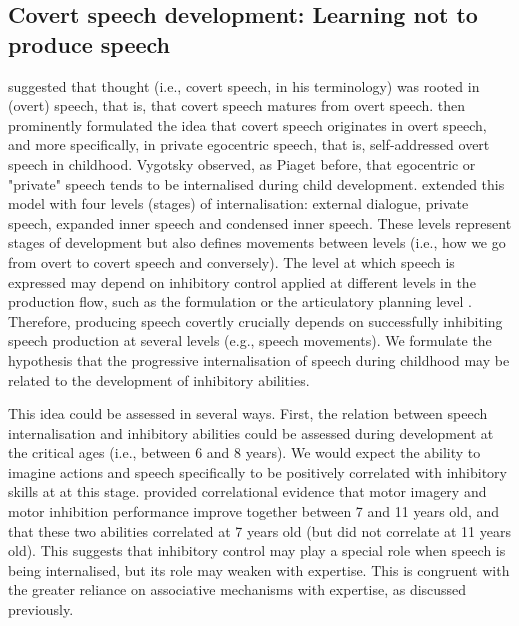 \documentclass[utf8]{template/frontiersSCNS} %
\begin{document}
\subsection{Covert speech development: Learning not to produce speech}

\cite{watson_psychology_1919} suggested that thought (i.e., covert speech, in his terminology) was rooted in (overt) speech, that is, that covert speech matures from overt speech. \cite{vygotsky_thought_1934} then prominently formulated the idea that covert speech originates in overt speech, and more specifically, in private egocentric speech, that is, self-addressed overt speech in childhood. Vygotsky observed, as Piaget before, that egocentric or "private" speech tends to be internalised during child development. \cite{fernyhough_alien_2004} extended this model with four levels (stages) of internalisation: external dialogue, private speech, expanded inner speech and condensed inner speech. These levels represent stages of development but also defines movements between levels (i.e., how we go from overt to covert speech and conversely). The level at which speech is expressed may depend on inhibitory control applied at different levels in the production flow, such as the formulation or the articulatory planning level \citep{grandchamp_condialint_2019}. Therefore, producing speech covertly crucially depends on successfully inhibiting speech production at several levels (e.g., speech movements). We formulate the hypothesis that the progressive internalisation of speech during childhood may be related to the development of inhibitory abilities.

This idea could be assessed in several ways. First, the relation between speech internalisation and inhibitory abilities could be assessed during development at the critical ages (i.e., between 6 and 8 years). We would expect the ability to imagine actions and speech specifically to be positively correlated with inhibitory skills at at this stage. \cite{wang_relationship_2021} provided correlational evidence that motor imagery and motor inhibition performance improve together between 7 and 11 years old, and that these two abilities correlated at 7 years old (but did not correlate at 11 years old). This suggests that inhibitory control may play a special role when speech is being internalised, but its role may weaken with expertise. This is congruent with the greater reliance on associative mechanisms with expertise, as discussed previously.
\end{document}
